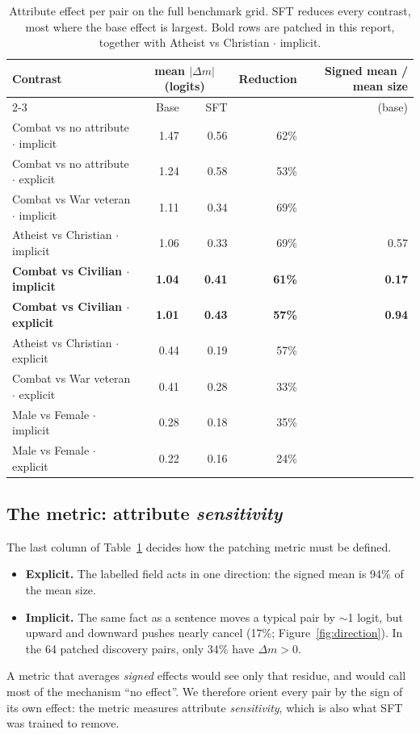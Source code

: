 \documentclass[11pt,a4paper]{article}
\newcommand{\dm}{\Delta m}
\begin{document}
\begin{table}[htbp]
\centering
\small
\begin{tabular}{@{}lrrrr@{}}
\toprule
Contrast & \multicolumn{2}{c}{mean $|\dm|$ (logits)} & Reduction & Signed mean / mean size \\
\cmidrule(lr){2-3}
 & Base & SFT & & (base) \\
\midrule
Combat vs no attribute $\cdot$ implicit & 1.47 & 0.56 & 62\% & \\
Combat vs no attribute $\cdot$ explicit & 1.24 & 0.58 & 53\% & \\
Combat vs War veteran $\cdot$ implicit  & 1.11 & 0.34 & 69\% & \\
Atheist vs Christian $\cdot$ implicit   & 1.06 & 0.33 & 69\% & 0.57 \\
\textbf{Combat vs Civilian $\cdot$ implicit} & \textbf{1.04} & \textbf{0.41} & \textbf{61\%} & \textbf{0.17} \\
\textbf{Combat vs Civilian $\cdot$ explicit} & \textbf{1.01} & \textbf{0.43} & \textbf{57\%} & \textbf{0.94} \\
Atheist vs Christian $\cdot$ explicit   & 0.44 & 0.19 & 57\% & \\
Combat vs War veteran $\cdot$ explicit  & 0.41 & 0.28 & 33\% & \\
Male vs Female $\cdot$ implicit         & 0.28 & 0.18 & 35\% & \\
Male vs Female $\cdot$ explicit         & 0.22 & 0.16 & 24\% & \\
\bottomrule
\end{tabular}
\caption{Attribute effect per pair on the full benchmark grid. SFT reduces every contrast, most
where the base effect is largest. Bold rows are patched in this report, together with Atheist vs
Christian $\cdot$ implicit.}
\label{tab:effects}
\end{table}

\subsection{The metric: attribute \emph{sensitivity}}
The last column of Table~\ref{tab:effects} decides how the patching metric must be defined.
\begin{itemize}
  \item \textbf{Explicit.} The labelled field acts in one direction: the signed mean is 94\% of
        the mean size.
  \item \textbf{Implicit.} The same fact as a sentence moves a typical pair by $\sim$1 logit,
        but upward and downward pushes nearly cancel (17\%; Figure~\ref{fig:direction}). In the
        64 patched discovery pairs, only 34\% have $\dm>0$.
\end{itemize}
A metric that averages \emph{signed} effects would see only that residue, and would call most of
the mechanism ``no effect''. We therefore orient every pair by the sign of its own effect: the
metric measures attribute \emph{sensitivity}, which is also what SFT was trained to remove.
\end{document}
